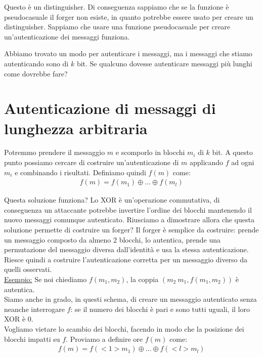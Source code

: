 \noindent Questo è un distinguisher. Di conseguenza sappiamo che se la funzione è pseudocasuale il forger non esiste, in quanto potrebbe essere usato per creare un distinguisher. Sappiamo che usare una funzione pseudocasuale per creare un'autenticazione dei messaggi funziona.

Abbiamo trovato un modo per autenticare i messaggi, ma i messaggi che stiamo autenticando sono di $k$ bit. Se qualcuno dovesse autenticare messaggi più lunghi come dovrebbe fare? 

\section{Autenticazione di messaggi di lunghezza arbitraria}

Potremmo prendere il messaggio $m$ e scomporlo in blocchi $m_i$ di $k$ bit. A questo punto possiamo cercare di costruire un'autenticazione di $m$ applicando $f$ ad ogni $m_i$ e combinando i risultati. Definiamo quindi $f(m)$ come:
\begin{align*}
    f(m) = f(m_1) \oplus ... \oplus f(m_l)
\end{align*}

\noindent Questa soluzione funziona? Lo XOR è un'operazione commutativa, di conseguenza un attaccante potrebbe invertire l'ordine dei blocchi mantenendo il nuovo messaggi comunque autenticato. Riusciamo a dimostrare allora che questa soluzione permette di costruire un forger? Il forger è semplice da costruire: prende un messaggio composto da almeno 2 blocchi, lo autentica, prende una permutazione del messaggio diversa dall'identità e usa la stessa autenticazione. Riesce quindi a costruire l'autenticazione corretta per un messaggio diverso da quelli osservati. 
\\

\noindent \underline{Esempio:}
\noindent Se noi chiediamo $f(m_1, m_2)$, la coppia $\left(m_2 \ m_1, f(m_1, m_2) \right)$ è autentica.
\\

\noindent Siamo anche in grado, in questi schema, di creare un messaggio autenticato senza neanche interrogare $f$: se il numero dei blocchi è pari e sono tutti uguali, il loro XOR è $0$.\\

\noindent Vogliamo vietare lo scambio dei blocchi, facendo in modo che la posizione dei blocchi impatti su $f$. Proviamo a definire ore $f(m)$ come:
\begin{align*}
    f(m) = f(<1> m_1) \oplus ... \oplus f(<l> m_l)
\end{align*}

